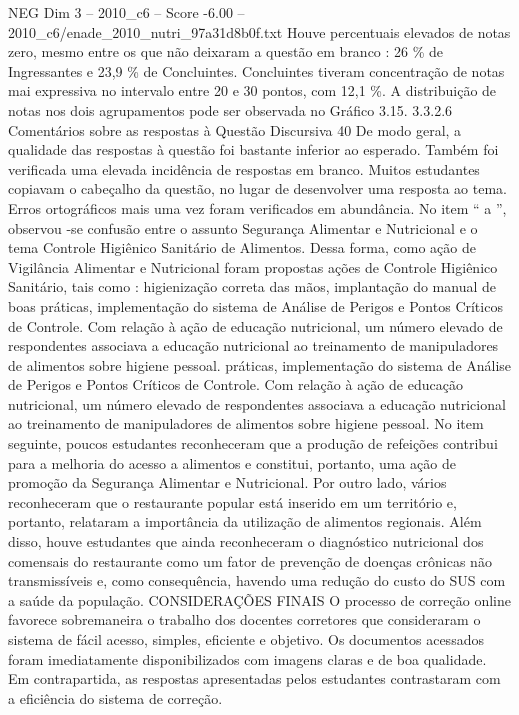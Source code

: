 \begin{textsample}{NEG Dim 3 – 2010\_c6 – Score -6.00 – 2010\_c6/enade\_2010\_nutri\_97a31d8b0f.txt}
Houve percentuais elevados de notas zero, mesmo entre os que não deixaram a questão em branco : 26 \% de Ingressantes e 23,9 \% de Concluintes.
Concluintes tiveram concentração de notas mai expressiva no intervalo entre 20 e 30 pontos, com 12,1 \%.
A distribuição de notas nos dois agrupamentos pode ser observada no Gráfico 3.15. 3.3.2.6 Comentários sobre as respostas à Questão Discursiva 40 De modo geral, a qualidade das respostas à questão foi bastante inferior ao esperado.
Também foi verificada uma elevada incidência de respostas em branco.
Muitos estudantes copiavam o cabeçalho da questão, no lugar de desenvolver uma resposta ao tema.
Erros ortográficos mais uma vez foram verificados em abundância.
No item “ a ”, observou -se confusão entre o assunto Segurança Alimentar e Nutricional e o tema Controle Higiênico Sanitário de Alimentos.
Dessa forma, como ação de Vigilância Alimentar e Nutricional foram propostas ações de Controle Higiênico Sanitário, tais como : higienização correta das mãos, implantação do manual de boas práticas, implementação do sistema de Análise de Perigos e Pontos Críticos de Controle.
Com relação à ação de educação nutricional, um número elevado de respondentes associava a educação nutricional ao treinamento de manipuladores de alimentos sobre higiene pessoal. práticas, implementação do sistema de Análise de Perigos e Pontos Críticos de Controle.
Com relação à ação de educação nutricional, um número elevado de respondentes associava a educação nutricional ao treinamento de manipuladores de alimentos sobre higiene pessoal.
No item seguinte, poucos estudantes reconheceram que a produção de refeições contribui para a melhoria do acesso a alimentos e constitui, portanto, uma ação de promoção da Segurança Alimentar e Nutricional.
Por outro lado, vários reconheceram que o restaurante popular está inserido em um território e, portanto, relataram a importância da utilização de alimentos regionais.
Além disso, houve estudantes que ainda reconheceram o diagnóstico nutricional dos comensais do restaurante como um fator de prevenção de doenças crônicas não transmissíveis e, como consequência, havendo uma redução do custo do SUS com a saúde da população.
CONSIDERAÇÕES FINAIS O processo de correção online favorece sobremaneira o trabalho dos docentes corretores que consideraram o sistema de fácil acesso, simples, eficiente e objetivo.
Os documentos acessados foram imediatamente disponibilizados com imagens claras e de boa qualidade.
Em contrapartida, as respostas apresentadas pelos estudantes contrastaram com a eficiência do sistema de correção.

\end{textsample}
